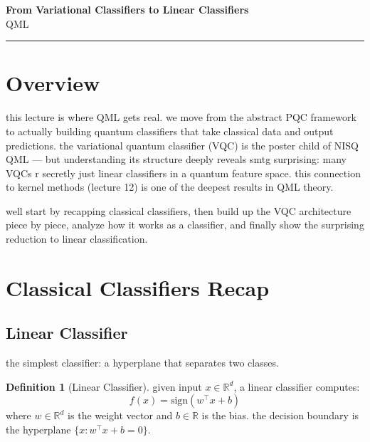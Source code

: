 \documentclass[11pt,a4paper]{article}
\theoremstyle{definition}
\newtheorem{definition}{Definition}[section]
\theoremstyle{remark}
\begin{document}
\begin{center}
    {\LARGE \textbf{From Variational Classifiers to Linear Classifiers}}\\[8pt]
    {\large QML}\\[12pt]
    \hrule
\end{center}

\vspace{12pt}
\tableofcontents
\newpage

\section{Overview}

this lecture is where QML gets real. we move from the abstract PQC framework to actually building quantum classifiers that take classical data and output predictions. the variational quantum classifier (VQC) is the poster child of NISQ QML --- but understanding its structure deeply reveals smtg surprising: many VQCs r secretly just linear classifiers in a quantum feature space. this connection to kernel methods (lecture 12) is one of the deepest results in QML theory.

well start by recapping classical classifiers, then build up the VQC architecture piece by piece, analyze how it works as a classifier, and finally show the surprising reduction to linear classification.

\section{Classical Classifiers Recap}

\subsection{Linear Classifier}

the simplest classifier: a hyperplane that separates two classes.

\begin{definition}[Linear Classifier]
given input $x \in \mathbb{R}^d$, a linear classifier computes:
\[
f(x) = \text{sign}(w^\top x + b)
\]
where $w \in \mathbb{R}^d$ is the weight vector and $b \in \mathbb{R}$ is the bias. the decision boundary is the hyperplane $\{x : w^\top x + b = 0\}$.
\end{definition}
\end{document}
